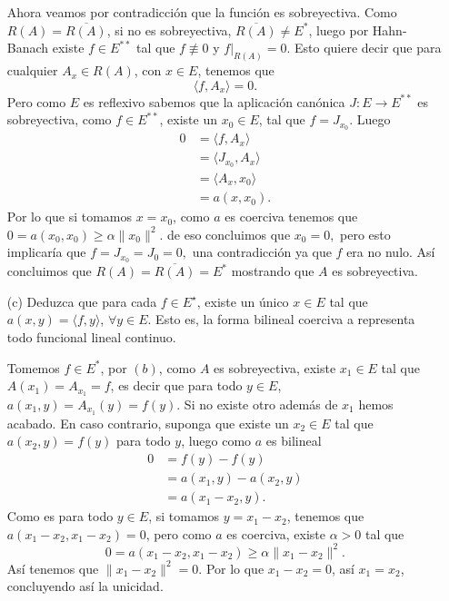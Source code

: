 \begin{itemize}
\begin{sproof}
       Ahora veamos por contradicción que la función es sobreyectiva. Como $R(A)=\overline{R(A)}$, si no es sobreyectiva, $\overline{R(A)}\neq E^*$, luego por Hahn-Banach existe $f\in E^{**}$ tal que $f\not\equiv 0$ y $f|_{R(A)}=0.$ Esto quiere decir que para cualquier $A_x\in R(A)$, con $x\in E$, tenemos que 
       $$\langle f,A_x\rangle=0.$$
       Pero como $E$ es reflexivo sabemos que la aplicación canónica $J:E\to E^{**}$ es sobreyectiva, como $f\in E^{**}$, existe un $x_0\in E$, tal que $f=J_{x_0}.$ Luego
       \begin{align*}
         0&=\langle f,A_x\rangle\\
         &=\langle J_{x_0},A_x\rangle\\
         &=\langle A_x,x_0\rangle\\
         &=a(x,x_0).
       \end{align*}
       Por lo que si tomamos $x=x_0$, como $a$ es coerciva tenemos que $0=a(x_0,x_0)\geq \alpha\|x_0\|^2.$ de eso concluimos que $x_0=0,$ pero esto implicaría que $f=J_{x_0}=J_0=0,$ una contradicción ya que $f$ era no nulo. Así concluimos que $R(A)=\overline{R(A)}=E^*$ mostrando que $A$ es sobreyectiva.

    \end{sproof}
    \item[(c)] Deduzca que para cada $f \in E^{\star}$, existe un único $x \in E$ tal que $a(x, y)=\langle f, y\rangle$, $\forall y \in E$. Esto es, la forma bilineal coerciva a representa todo funcional lineal continuo.
    \begin{sproof}
      Tomemos $f\in E^*$, por $(b)$, como $A$ es sobreyectiva, existe $x_1\in E$ tal que $A(x_1)=A_{x_1}=f$, es decir que para todo $y\in E$, $a(x_1,y)=A_{x_1}(y)=f(y).$ Si no existe otro además de $x_1$ hemos acabado. En caso contrario, suponga que existe un $x_2\in E$ tal que $a(x_2,y)=f(y)$ para todo $y$, luego como $a$ es bilineal
      \begin{align*}
        0&=f(y)-f(y)\\
        &=a(x_1,y)-a(x_2,y)\\
        &=a(x_1-x_2,y).
      \end{align*}
      Como es para todo $y\in E$, si tomamos $y=x_1-x_2$, tenemos que $a(x_1-x_2,x_1-x_2)=0$, pero como $a$ es coerciva, existe $\alpha>0$ tal que
      $$0=a(x_1-x_2,x_1-x_2)\geq\alpha\|x_1-x_2\|^2.$$
      Así tenemos que $\|x_1-x_2\|^2=0.$ Por lo que $x_1-x_2=0$, así $x_1=x_2$, concluyendo así la unicidad. 
    \end{sproof}
\end{itemize}
